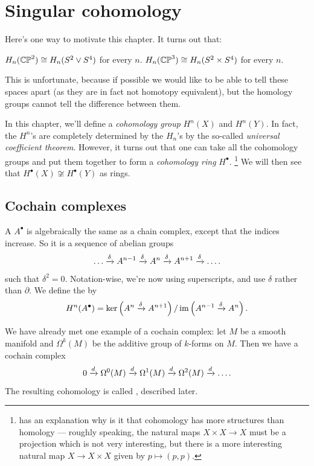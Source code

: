 \chapter{Singular cohomology}
\label{ch:singular_cohomology}
Here's one way to motivate this chapter. It turns out that:
\begin{itemize}
	\ii $H_n(\mathbb{CP}^2) \cong H_n(S^2 \vee S^4)$ for every $n$.
	\ii $H_n(\mathbb{CP}^3) \cong H_n(S^2 \times S^4)$ for every $n$.
\end{itemize}
This is unfortunate, because if possible we would like
to be able to tell these spaces apart (as they are
in fact not homotopy equivalent), but the homology groups
cannot tell the difference between them.

In this chapter, we'll define a \emph{cohomology group} $H^n(X)$ and $H^n(Y)$.
In fact, the $H^n$'s are completely determined by the $H_n$'s
by the so-called \emph{universal coefficient theorem}.
However, it turns out that one can take all the cohomology groups and put
them together to form a \emph{cohomology ring} $H^\bullet$.%
\footnote{\cite{ref:hatcher} has an explanation why is it that cohomology has more structures than
homology --- roughly speaking, the natural maps $X \times X \to X$ must be a projection which is not
very interesting, but there is a more interesting natural map $X \to X \times X$ given by $p \mapsto
(p, p)$.}
We will then see that $H^\bullet(X) \not\cong H^\bullet(Y)$ as rings.

\section{Cochain complexes}
\begin{definition}
A  $A^\bullet$ is algebraically the same as a chain complex,
except that the indices increase.
So it is a sequence of abelian groups
\[ \dots \xrightarrow{\delta} A^{n-1} \xrightarrow{\delta} A^n \xrightarrow{\delta} A^{n+1} \xrightarrow{\delta} \dots. \]
such that $\delta^2 = 0$.
Notation-wise, we're now using superscripts, and use $\delta$ rather than $\partial$.
We define the  by
\[ H^n(A^\bullet) = \ker\left( A^n \xrightarrow{\delta} A^{n+1} \right)
	/ \operatorname{im}\left( A^{n-1} \xrightarrow{\delta} A^n \right). \]
\end{definition}

\begin{example}
	We have already met one example of a cochain complex:
	let $M$ be a smooth manifold and $\Omega^k(M)$ be the
	additive group of $k$-forms on $M$.
	Then we have a cochain complex
	\[ 0 \xrightarrow{d} \Omega^0(M)
		\xrightarrow{d} \Omega^1(M) \xrightarrow{d} \Omega^2(M)
		\xrightarrow{d} \dots. \]
	The resulting cohomology is called ,
	described later.
\end{example}

